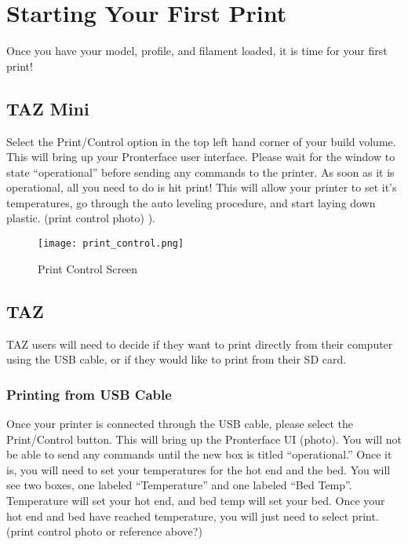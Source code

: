 \section{Starting Your First Print}

Once you have your model, profile, and filament loaded, it is time for your first print! 

\subsection{TAZ Mini}

Select the Print/Control option in the top left hand corner of your build volume. This will bring up your Pronterface user interface. Please wait for the window to state “operational” before sending any commands to the printer. As soon as it is operational, all you need to do is hit print! This will allow your printer to set it's temperatures, go through the auto leveling procedure, and start laying down plastic. (print control photo)
\pageref{fig:Print Control}).
\begin{figure}[hbt]
\centering
\texttt{[image: print\_control.png]}
\caption{Print Control Screen}
\label{fig:Print Control}
\end{figure}

\subsection{TAZ}

TAZ users will need to decide if they want to print directly from their computer using the USB cable, or if they would like to print from their SD card. 

\subsubsection{Printing from USB Cable}

Once your printer is connected through the USB cable, please select the Print/Control button. This will bring up the Pronterface UI (photo). You will not be able to send any commands until the new box is titled “operational.” Once it is, you will need to set your temperatures for the hot end and the bed. You will see two boxes, one labeled “Temperature” and one labeled “Bed Temp”. Temperature will set your hot end, and bed temp will set your bed. Once your hot end and bed have reached temperature, you will just need to select print. (print control photo or reference above?)

